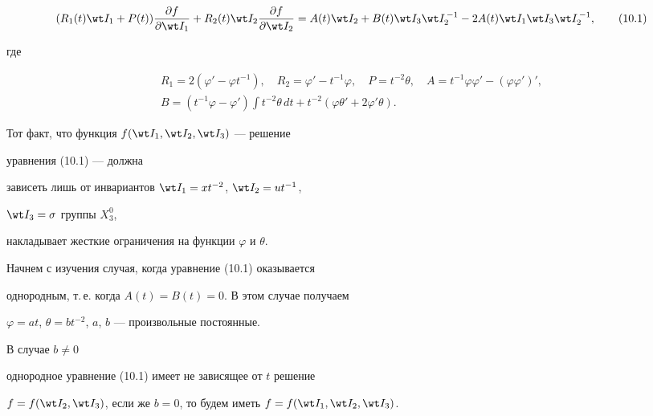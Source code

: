 \begin{equation} 


(R_1(t)\wt I_1+P(t)) 


\frac{\partial f}{\partial \wt I_1}+R_2(t)\wt I_2 


\frac{\partial f}{\partial \wt I_2}=A(t)\wt I_2+ 


B(t)\wt I_3\wt I^{\,-1}_2-2A(t)\wt I_1\wt I_3 


\wt I^{\,-1}_2,\tag{10.1} 


\end{equation} 


где 


\begin{gather*} 


R_1=2(\varphi'-\varphi t^{-1}),\quad 


R_2=\varphi'-t^{-1}\varphi,\quad 


P=t^{-2}\theta,\quad A=t^{-1}\varphi\varphi'- 


(\varphi\varphi')',\\ 


B=(t^{-1}\varphi-\varphi')\int t^{-2}\theta\,dt+ 


t^{-2}(\varphi\theta'+2\varphi'\theta). 


\end{gather*} 


Тот факт, что функция $f(\wt I_1,\wt I_2,\wt I_3)$ --- решение 


уравнения (10.1) --- должна 


зависеть лишь от инвариантов $\wt I_1=x t^{-2}$, $\wt I_2=u t^{-1}$, 


$\wt I_3=\sigma$ группы $X^0_3$, 


накладывает жесткие ограничения на функции $\varphi$ и $\theta$. 


 


Начнем с изучения случая, когда уравнение (10.1) оказывается 


однородным, т.\,е. когда $A(t)=B(t)=0$. В этом случае получаем 


$\varphi=at$, $\theta=b{}t^{-2}$, $a$, $b$ --- произвольные постоянные. 


В случае $b\ne0$ 


однородное уравнение (10.1) имеет не зависящее от $t$ решение 


$f=f(\wt I_2,\wt I_3)$, если же $b=0$, то будем иметь $f=f(\wt I_1,\wt 


I_2,\wt I_3)$. 


